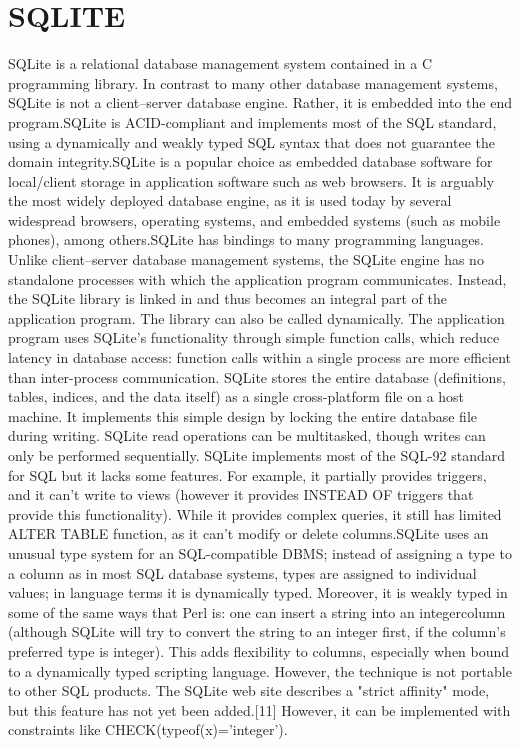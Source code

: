 \section{SQLITE}
SQLite is a relational database management system contained in a C programming library. In contrast to many other database management systems, SQLite is not a client–server database engine. Rather, it is embedded into the end program.SQLite is ACID-compliant and implements most of the SQL standard, using a dynamically and weakly typed SQL syntax that does not guarantee the domain integrity.SQLite is a popular choice as embedded database software for local/client storage in application software such as web browsers. It is arguably the most widely deployed database engine, as it is used today by several widespread browsers, operating systems, and embedded systems (such as mobile phones), among others.SQLite has bindings to many programming languages.
Unlike client–server database management systems, the SQLite engine has no standalone processes with which the application program communicates. Instead, the SQLite library is linked in and thus becomes an integral part of the application program. The library can also be called dynamically. The application program uses SQLite's functionality through simple function calls, which reduce latency in database access: function calls within a single process are more efficient than inter-process communication. SQLite stores the entire database (definitions, tables, indices, and the data itself) as a single cross-platform file on a host machine. It implements this simple design by locking the entire database file during writing. SQLite read operations can be multitasked, though writes can only be performed sequentially.
SQLite implements most of the SQL-92 standard for SQL but it lacks some features. For example, it partially provides triggers, and it can't write to views (however it provides INSTEAD OF triggers that provide this functionality). While it provides complex queries, it still has limited ALTER TABLE function, as it can't modify or delete columns.SQLite uses an unusual type system for an SQL-compatible DBMS; instead of assigning a type to a column as in most SQL database systems, types are assigned to individual values; in language terms it is dynamically typed. Moreover, it is weakly typed in some of the same ways that Perl is: one can insert a string into an integercolumn (although SQLite will try to convert the string to an integer first, if the column's preferred type is integer). This adds flexibility to columns, especially when bound to a dynamically typed scripting language. However, the technique is not portable to other SQL products. The SQLite web site describes a "strict affinity" mode, but this feature has not yet been added.[11] However, it can be implemented with constraints like CHECK(typeof(x)='integer').



